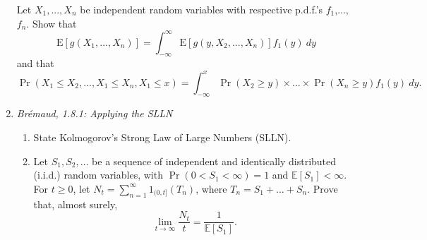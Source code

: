 \documentclass{article} %
\begin{document}
\begin{enumerate}
Let $X_1,...,X_n$ be independent random variables with respective p.d.f.'s
$f_1$,...,$f_n$. Show that
$$\mbox{E}[ g(X_1,...,X_n)] = \int_{-\infty}^{\infty} \mbox{E}[g(y,X_2,...,X_n)] f_1(y) ~dy$$
and that
$$\Pr( X_1 \leq X_2,...,X_1 \leq X_n,X_1 \leq x) = \int_{-\infty}^x \Pr(X_2 \geq y) \times ...\times \Pr(X_n \geq y) f_1(y)~dy.$$

\item {\it Br\'{e}maud, 1.8.1: Applying the SLLN}
  \begin{enumerate}
  \item State Kolmogorov's Strong Law of Large Numbers (SLLN).
  \item Let $S_1,S_2,\dots$ be a sequence of independent and
    identically distributed (i.i.d.) random variables, with
    $\Pr(0<S_1<\infty)=1$ and $\mathbb{E}[S_1]<\infty$.  For $t\ge 0$,
    let $N_t=\sum_{n=1}^\infty 1_{(0,t]}(T_n)$, where
    $T_n=S_1+\dots+S_n$.  Prove that, almost surely,
    \[
    \lim_{t\to\infty} \frac{N_t}{t} = \frac{1}{\mathbb{E}[S_1]}.
    \]
  \end{enumerate}

\end{enumerate}
\end{document}
